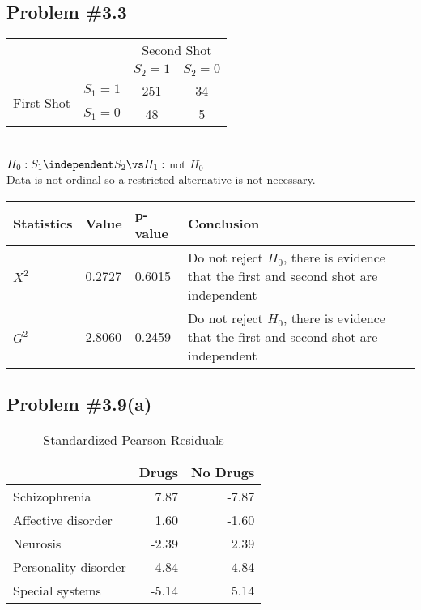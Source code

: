 \documentclass[12pt, letterpaper]{article}
\begin{document}
\subsection*{Problem {\#}3.3}  

\begin{wraptable}{l}{3in} 
\vspace{-12pt} 
\begin{tabular}{c l cc }
							&			& \multicolumn{2}{c}{Second Shot} \\
							&			& $S_2 = 1$	& $S_2 = 0$ 	\\ \cline{3-4} 
\multirow{2}{*}{First Shot} & $S_1 = 1$	& \multicolumn{1}{|c}{251}		& \multicolumn{1}{|c|}{34}\\ \cline{3-4} 
							& $S_1 = 0$ 	& \multicolumn{1}{|c}{48}		& \multicolumn{1}{|c|}{5} \\ \cline{3-4}
\end{tabular}
\vspace{-60pt} 
\end{wraptable} 

\quad \\[12pt]
$H_0: S_1 \independent S_2 \vs H_1:$ not $H_0$  
\\[36pt]
Data is not ordinal so a restricted alternative is not necessary.  

\begin{tabu}{X[l, 1] X[l, 1] X[l, 1] X[l, 4]}
\textbf{Statistics} & \textbf{Value} & \textbf{p-value} & \textbf{Conclusion} \\ \hline 
$X^2$ & 0.2727 & 0.6015 & Do not reject $H_0$, there is evidence that the first and second shot are independent \\ \hline
$G^2$ & 2.8060 & 0.2459 & Do not reject $H_0$, there is evidence that the first and second shot are independent \\ \hline 
\end{tabu}

\subsection*{Problem {\#}3.9(a)}

\begin{wraptable}{l}{3in} 
	\vspace{-12pt} 
	\caption{Standardized Pearson Residuals} 
	\centering
\begin{tabular}{lrr}
	\hline
	& Drugs & No Drugs \\ 
	\hline
	Schizophrenia & 7.87 & -7.87 \\ 
	Affective disorder & 1.60 & -1.60 \\ 
	Neurosis & -2.39 & 2.39 \\ 
	Personality disorder & -4.84 & 4.84 \\ 
	Special systems & -5.14 & 5.14 \\ 
	\hline
\end{tabular}
\end{wraptable}
\end{document}
